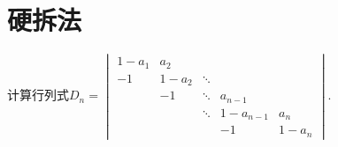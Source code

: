 \section{硬拆法}

\begin{example}
    计算行列式$D_n=\begin{vmatrix}
            1-a_{1} & a_{2}   &        &           &         \\
            -1      & 1-a_{2} & \ddots &           &         \\
                    & -1      & \ddots & a_{n-1}   &         \\
                    &         & \ddots & 1-a_{n-1} & a_{n}   \\
                    &         &        & -1        & 1-a_{n}
        \end{vmatrix}$.
\end{example}

